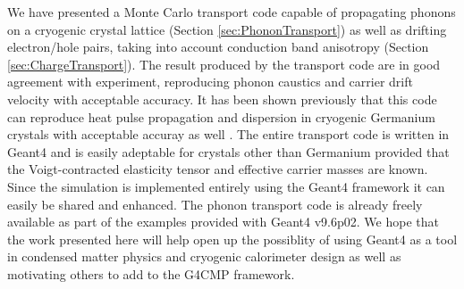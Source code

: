 \documentclass[preprint,12pt]{elsarticle}
\begin{document}
We have presented a Monte Carlo transport code capable of propagating phonons on a cryogenic crystal lattice (Section \ref{sec:PhononTransport}) as well as drifting electron/hole pairs, taking into account conduction band anisotropy (Section \ref{sec:ChargeTransport}). The result produced by the transport code are in good agreement with experiment, reproducing phonon caustics and carrier drift velocity with acceptable accuracy. It has been shown previously that this code can reproduce heat pulse propagation and dispersion in cryogenic Germanium crystals with acceptable accuray as well \cite{Brandt}. The entire transport code is written in Geant4 and is easily adeptable for crystals other than Germanium provided that the Voigt-contracted elasticity tensor and effective carrier masses are known. Since the simulation is implemented entirely using the Geant4 framework it can easily be shared and enhanced. The phonon transport code is already freely available as part of the examples provided with  Geant4 v9.6p02. We hope that the work presented here will help open up the possiblity of using Geant4 as a tool in condensed matter physics and cryogenic calorimeter design as well as motivating others to add to the G4CMP framework.



\end{document}
